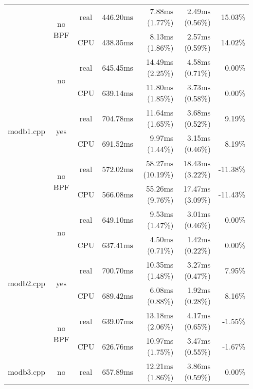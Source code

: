 \documentclass[en]{pracamgr}
\begin{document}
\begin{small}
\begin{longtable}{|l|c|c|r|r|r|r|}
                            \cline{2-7}
                            & \multirow{2}{*}{no BPF} & real & 446.20ms & 7.88ms (1.77\%) & 2.49ms (0.56\%) & 15.03\% \\*
                            &                         & CPU  & 438.35ms & 8.13ms (1.86\%) & 2.57ms (0.59\%) & 14.02\% \\
\hline
\multirow{6}{*}{modb1.cpp}  & \multirow{2}{*}{no}     & real & 645.45ms & 14.49ms (2.25\%) & 4.58ms (0.71\%) & 0.00\% \\*
                            &                         & CPU  & 639.14ms & 11.80ms (1.85\%) & 3.73ms (0.58\%) & 0.00\% \\*
                            \cline{2-7}
                            & \multirow{2}{*}{yes}    & real & 704.78ms & 11.64ms (1.65\%) & 3.68ms (0.52\%) & 9.19\% \\*
                            &                         & CPU  & 691.52ms & 9.97ms (1.44\%) & 3.15ms (0.46\%) & 8.19\% \\*
                            \cline{2-7}
                            & \multirow{2}{*}{no BPF} & real & 572.02ms & 58.27ms (10.19\%) & 18.43ms (3.22\%) & -11.38\% \\*
                            &                         & CPU  & 566.08ms & 55.26ms (9.76\%) & 17.47ms (3.09\%) & -11.43\% \\
\hline
\multirow{6}{*}{modb2.cpp}  & \multirow{2}{*}{no}     & real & 649.10ms & 9.53ms (1.47\%) & 3.01ms (0.46\%) & 0.00\% \\*
                            &                         & CPU  & 637.41ms & 4.50ms (0.71\%) & 1.42ms (0.22\%) & 0.00\% \\*
                            \cline{2-7}
                            & \multirow{2}{*}{yes}    & real & 700.70ms & 10.35ms (1.48\%) & 3.27ms (0.47\%) & 7.95\% \\*
                            &                         & CPU  & 689.42ms & 6.08ms (0.88\%) & 1.92ms (0.28\%) & 8.16\% \\* \cline{2-7}
                            & \multirow{2}{*}{no BPF} & real & 639.07ms & 13.18ms (2.06\%) & 4.17ms (0.65\%) & -1.55\% \\*
                            &                         & CPU  & 626.76ms & 10.97ms (1.75\%) & 3.47ms (0.55\%) & -1.67\% \\
\hline
\multirow{6}{*}{modb3.cpp}  & \multirow{2}{*}{no}     & real & 657.89ms & 12.21ms (1.86\%) & 3.86ms (0.59\%) & 0.00\% \\*

\end{longtable}
\end{small}
\end{document}
